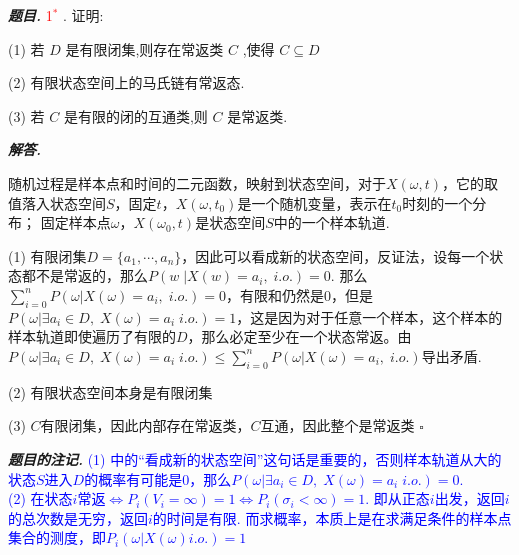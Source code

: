 \documentclass[10pt, a4paper, oneside]{ctexart}
\newenvironment{problem}{\begin{framed}\par\noindent\textbf{\textit{题目. }}}{\end{framed}\par}
\newenvironment{solution}{%
  \par\noindent\textbf{\textit{解答. }}\ignorespaces
}{%
  \hfill\ensuremath{\square}\par %
}
\newenvironment{note}{\par\noindent\textbf{\textit{题目的注记. }}\ignorespaces}{\par}
\begin{document}
\begin{problem}
\textcolor{red}{1$^*$  }. 证明:

(1) 若 $D$ 是有限闭集,则存在常返类 $C$ ,使得 $C \subseteq D$

(2) 有限状态空间上的马氏链有常返态.

(3) 若 $C$ 是有限的闭的互通类,则 $C$ 是常返类.   
\end{problem}
\begin{solution}
随机过程是样本点和时间的二元函数，映射到状态空间，对于$X(\omega,t)$，它的取值落入状态空间$S$，固定$t$，$X(\omega,t_0)$是一个随机变量，表示在$t_0$时刻的一个分布； 固定样本点$\omega$，$X(\omega_0,t)$是状态空间$S$中的一个样本轨道.

(1) 有限闭集$D=\{a_1,\cdots,a_n\}$，因此可以看成新的状态空间，反证法，设每一个状态都不是常返的，那么$P(w\;|X(w)=a_i, \;i.o.)=0$. 那么$\sum_{i=0}^n P(\omega| X(\omega)=a_i,\;i.o.)=0$，有限和仍然是$0$，但是$P(\omega| \exists a_i \in D, \; X(\omega)=a_i\; i.o.)=1$，这是因为对于任意一个样本，这个样本的样本轨道即使遍历了有限的$D$，那么必定至少在一个状态常返。由$P(\omega| \exists a_i \in D, \; X(\omega)=a_i\; i.o.)\leq \sum_{i=0}^n P(\omega| X(\omega)=a_i,\;i.o.)$导出矛盾.

(2) 有限状态空间本身是有限闭集

(3) $C$有限闭集，因此内部存在常返类，$C$互通，因此整个是常返类
\end{solution}

\begin{note}
\textcolor{blue}{(1) 中的“看成新的状态空间”这句话是重要的，否则样本轨道从大的状态$S$进入$D$的概率有可能是$0$，那么$P(\omega| \exists a_i \in D, \; X(\omega)=a_i\; i.o.)=0$.\\(2) 在状态$i$常返$\iff P_i(V_i=\infty)=1\iff P_i(\sigma_i<\infty)=1$. 即从正态$i$出发，返回$i$的总次数是无穷，返回$i$的时间是有限. 而求概率，本质上是在求满足条件的样本点集合的测度，即$P_i(\omega|X(\omega) i.o.)=1$}
\end{note}
\end{document}
